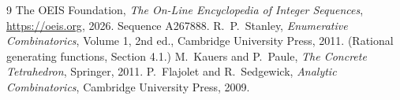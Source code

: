 \documentclass[11pt,a4paper]{article}
\theoremstyle{plain}
\theoremstyle{definition}
\begin{document}
\begin{thebibliography}{9}
 The OEIS Foundation, \emph{The On-Line Encyclopedia of Integer
Sequences}, \url{https://oeis.org}, 2026. Sequence A267888.
 R.~P.~Stanley, \emph{Enumerative Combinatorics}, Volume 1, 2nd ed.,
Cambridge University Press, 2011. (Rational generating functions, Section 4.1.)
 M.~Kauers and P.~Paule, \emph{The Concrete Tetrahedron}, Springer, 2011.
 P.~Flajolet and R.~Sedgewick, \emph{Analytic Combinatorics}, Cambridge
University Press, 2009.
\end{thebibliography}
\end{document}

